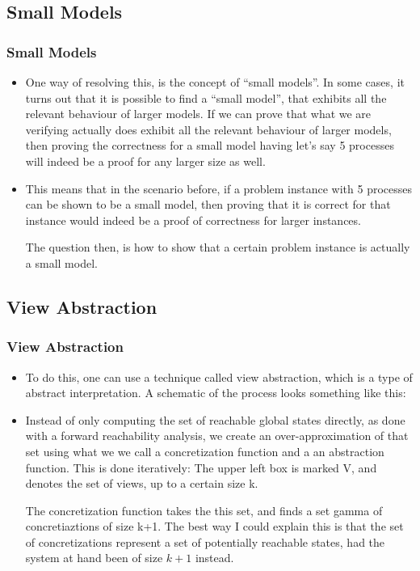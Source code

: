 \documentclass[handout]{beamer}
\begin{document}
\begin{footnotesize}
\subsection{Small Models}
\begin{frame}
  \frametitle{Small Models}
  \begin{itemize}
  \item
    One way of resolving this, is the concept of ``small models''. In some cases, it turns out that it is possible to find a ``small model'', that exhibits all the relevant behaviour of larger models. If we can prove that what we are verifying actually does exhibit all the relevant behaviour of larger models, then proving the correctness for a small model having let's say 5 processes will indeed be a proof for any larger size as well.
\item
This means that in the scenario before, if a problem instance with 5 processes can be shown to be a small model, then proving that it is correct for that instance would indeed be a proof of correctness for larger instances.

The question then, is how to show that a certain problem instance is actually a small model.
  \end{itemize}
\end{frame}

\subsection{View Abstraction}
\begin{frame}
\frametitle{View Abstraction} %

\begin{itemize}
\item
To do this, one can use a technique called view abstraction, which is a type of abstract interpretation. A schematic of the process looks something like this:
\item
Instead of only computing the set of reachable global states directly, as done with a forward reachability analysis, we create an over-approximation of that set using what we we call a concretization function and a an abstraction function. This is done iteratively: The upper left box is marked V, and denotes the set of views, up to a certain size k.

The concretization function takes the this set, and finds a set gamma of concretiaztions of size k+1. The best way I could explain this is that the set of concretizations represent a set of potentially reachable states, had the system at hand been of size $k+1$ instead.


\end{itemize}
\end{frame}
\end{footnotesize}
\end{document}
